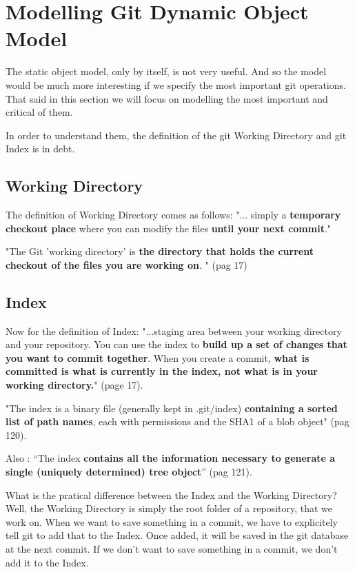 \section {Modelling Git Dynamic Object Model}
The static object model, only by itself, 
is not very useful. And so
the model would be much more interesting if we specify 
the most important git operations. That said in this
section we will focus on modelling the most important
and critical of them. \par

In order to understand them, the definition
of the git Working Directory and git Index is in debt. \par


\subsection{Working Directory}
The definition of Working Directory comes as follows:
"... simply a {\bf temporary checkout place} where you can 
modify the files {\bf until your next commit}."
\par
"The Git 'working directory' is {\bf the directory that holds 
the current \gls{checkout} of the files you are working on}.
"\cite{gitComm} (pag 17)\par

\subsection{Index}
Now for the definition of Index:
"...staging area between your working directory and your
repository. You can use the index to {\bf build up a set of 
changes that you want to commit together}. When you create
a commit, {\bf what is committed is what is currently in the
index, not what is in your working directory.}"
\cite{gitComm} (page 17). \par

"The index is a binary file (generally kept in .git/index) 
{\bf containing a sorted list of path names}, each with permissions and the
SHA1 of a blob object" \cite{gitComm} (pag 120). 

Also : ``The index {\bf contains all the information necessary to generate a single
(uniquely determined) tree object}'' \cite{gitComm} (pag 121). \par

What is the pratical difference between the Index and the Working
Directory? Well, the Working Directory is simply the root folder of a repository,
that we work on. When we want to save something in a commit, we have to explicitely 
tell git to add that to the Index. Once added, it
will be saved in the git database at the next commit. If we don't want to save
something in a commit, we  don't add it to the Index.

